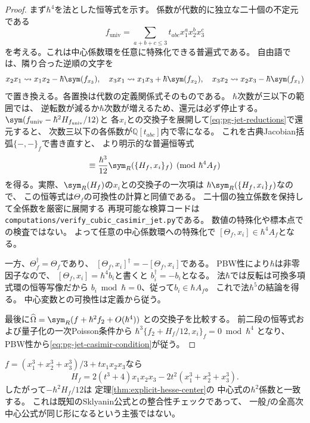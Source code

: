 \begin{proof}
まず$\hbar^4$を法とした恒等式を示す。
係数が代数的に独立な二十個の不定元である
\begin{equation}
 f_{\mathrm{univ}}=\sum_{a+b+c\le3}
 t_{abc}x_1^a x_2^b x_3^c
\end{equation}
を考える。これは中心係数環を任意に特殊化できる普遍式である。
自由語では、隣り合った逆順の文字を
\begin{equation}
 x_2x_1\rightsquigarrow x_1x_2-\hbar\sym(f_{x_3}),\quad
 x_3x_1\rightsquigarrow x_1x_3+\hbar\sym(f_{x_2}),\quad
 x_3x_2\rightsquigarrow x_2x_3-\hbar\sym(f_{x_1})
 \label{eq:pg-jet-reductions}
\end{equation}
で置き換える。各置換は代数の定義関係式そのものである。
$\hbar$次数が三以下の範囲では、
逆転数が減るか$\hbar$次数が増えるため、還元は必ず停止する。
$\sym(f_{\mathrm{univ}}-\hbar^2H_{f_{\mathrm{univ}}}/12)$と
各$x_i$との交換子を展開して\eqref{eq:pg-jet-reductions}で還元すると、
次数三以下の各係数が$\mathbb Q[t_{abc}]$内で零になる。
これを古典Jacobian括弧$\{-,-\}_f$で書き直すと、
より明示的な普遍恒等式
\begin{equation}
 [\sym_R(f),x_i]\equiv
 \frac{\hbar^3}{12}\sym_R(\{H_f,x_i\}_f)
 \pmod{\hbar^4 A_f}
 \label{eq:pg-jet-hessian-identity}
\end{equation}
を得る。実際、$\sym_R(H_f)$の$x_i$との交換子の一次項は
$\hbar\sym_R(\{H_f,x_i\}_f)$なので、
この恒等式は$\Theta_f$の可換性の計算と同値である。
二十個の独立係数を保持して全係数を厳密に展開する
再現可能な検算コードは
\texttt{computations/verify\_cubic\_casimir\_jet.py}である。
数値の特殊化や標本点での検査ではない。
よって任意の中心係数環への特殊化で
$[\Theta_f,x_i]\in\hbar^4A_f$となる。

一方、$\Theta_f^\dagger=\Theta_f$であり、
$[\Theta_f,x_i]^\dagger=-[\Theta_f,x_i]$である。
PBW性により$\hbar$は非零因子なので、
$[\Theta_f,x_i]=\hbar^4b_i$と書くと
$b_i^\dagger=-b_i$となる。
法$\hbar$では反転は可換多項式環の恒等写像だから
$b_i\bmod\hbar=0$、従って$b_i\in\hbar A_f$。
これで法$\hbar^5$の結論を得る。
中心変数との可換性は定義から従う。

最後に$\widehat\Omega=\sym_R(f+\hbar^2f_2+O(\hbar^4))$
との交換子を比較する。
前二段の恒等式および量子化の一次Poisson条件から
$\hbar^3\{f_2+H_f/12,x_i\}_f=0\bmod\hbar^4$
となり、PBW性から\eqref{eq:pg-jet-casimir-condition}が従う。
\end{proof}
\begin{remark}[Hesse公式との照合]
$f=(x_1^3+x_2^3+x_3^3)/3+t x_1x_2x_3$なら
\begin{equation}
 H_f=2(t^3+4)x_1x_2x_3-2t^2(x_1^3+x_2^3+x_3^3).
\end{equation}
したがって$-\hbar^2H_f/12$は
定理\ref{thm:explicit-hesse-center}の
中心式の$\hbar^2$係数と一致する。
これは既知のSklyanin公式との整合性チェックであって、
一般$f$の全高次中心公式が同じ形になるという主張ではない。
\end{remark}

